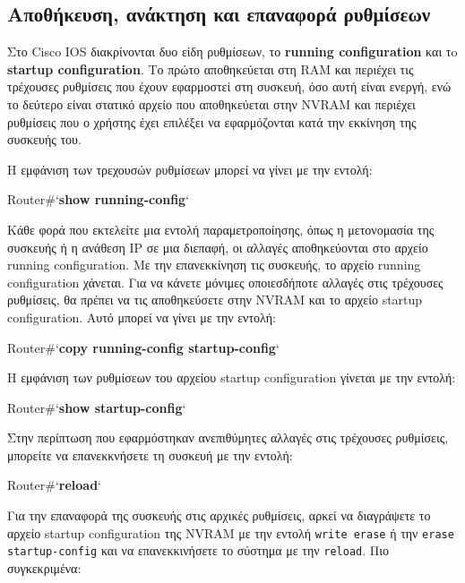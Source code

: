 \documentclass{EdipyLabs} %
\begin{document}
\subsection{Αποθήκευση, ανάκτηση και επαναφορά ρυθμίσεων}

Στο Cisco IOS διακρίνονται δυο είδη ρυθμίσεων, το \textbf{running configuration} και τo \textbf{startup configuration}. Το πρώτο αποθηκεύεται στη RAM και περιέχει τις τρέχουσες ρυθμίσεις που έχουν εφαρμοστεί στη συσκευή, όσο αυτή είναι ενεργή, ενώ το δεύτερο είναι στατικό αρχείο που αποθηκεύεται στην NVRAM και περιέχει ρυθμίσεις που ο χρήστης έχει επιλέξει να εφαρμόζονται κατά την εκκίνηση της συσκευής του.

Η εμφάνιση των τρεχουσών ρυθμίσεων μπορεί να γίνει με την εντολή:

\begin{CommandBox}
Router#`\textbf{show running-config}`
\end{CommandBox}

Κάθε φορά που εκτελείτε μια εντολή παραμετροποίησης, όπως η μετονομασία της συσκευής ή η ανάθεση IP σε μια διεπαφή, οι αλλαγές αποθηκεύονται στο αρχείο running configuration. Με την επανεκκίνηση τις συσκευής, το αρχείο running configuration χάνεται. Για να κάνετε μόνιμες οποιεσδήποτε αλλαγές στις τρέχουσες ρυθμίσεις, θα πρέπει να τις αποθηκεύσετε στην NVRAM και το αρχείο startup configuration. Αυτό μπορεί να γίνει με την εντολή:

\begin{CommandBox}
Router#`\textbf{copy running-config startup-config}`
\end{CommandBox}

Η εμφάνιση των ρυθμίσεων του αρχείου startup configuration γίνεται με την εντολή: 

\begin{CommandBox}
Router#`\textbf{show startup-config}`
\end{CommandBox}

Στην περίπτωση που εφαρμόστηκαν ανεπιθύμητες αλλαγές στις τρέχουσες ρυθμίσεις, μπορείτε να επανεκκνήσετε τη συσκευή με την εντολή: 

\begin{CommandBox}
Router#`\textbf{reload}`
\end{CommandBox}

Για την επαναφορά της συσκευής στις αρχικές ρυθμίσεις, αρκεί να διαγράψετε το αρχείο startup configuration της NVRAM με την εντολή \texttt{write erase} ή την \texttt{erase startup-config} και να επανεκκινήσετε το σύστημα με την \texttt{reload}. Πιο συγκεκριμένα:
\end{document}
